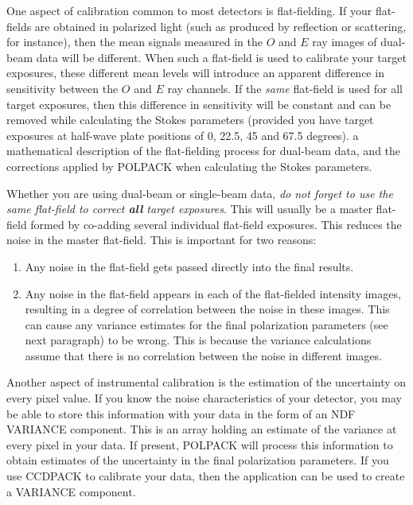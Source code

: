 \documentclass[twoside,11pt]{starlink}
\begin{document}
One aspect of calibration common to most detectors is flat-fielding. If
your flat-fields are obtained in polarized light (such as produced by
reflection or scattering, for instance), then the mean signals measured
in the $O$ and $E$ ray images of dual-beam data will be different. When
such a flat-field
is used to calibrate your target exposures, these different mean levels
will introduce an apparent difference in sensitivity between the $O$ and
$E$ ray channels. If the \emph{same} flat-field is used for all target
exposures, then this difference in sensitivity will be constant and can
be removed while calculating the Stokes parameters (provided you have
target exposures at half-wave plate positions of 0, 22.5, 45 and 67.5
degrees).  a
mathematical description of the flat-fielding process for dual-beam data,
and the corrections applied by POLPACK when calculating the Stokes parameters.

Whether you are using dual-beam or single-beam data, \emph{do not forget to
use the same flat-field to correct \textbf{all} target exposures}. This
will usually be a master flat-field formed by co-adding several
individual flat-field exposures. This reduces the noise in the master
flat-field. This is important for two reasons:

\begin{enumerate}
\item Any noise in the flat-field gets passed directly into the final results.
\item Any noise in the flat-field appears in each of the flat-fielded
intensity images, resulting in a degree of correlation between the noise in
these images. This can cause any variance estimates for the final
polarization parameters (see next paragraph) to be wrong. This is because
the variance calculations assume that there is no correlation between the
noise in different images.
\end{enumerate}

Another aspect of instrumental calibration is the estimation of the
uncertainty on every pixel value. If you know the noise characteristics
of your detector, you may be able to store this information with your
data in the form of an NDF VARIANCE component. This is an array
holding an estimate of the variance at every pixel in your data. If
present, POLPACK will process this information to obtain estimates of the
uncertainty in the final polarization parameters. If you use CCDPACK to
calibrate your data, then the  application
can be used to create a VARIANCE component.
\end{document}
